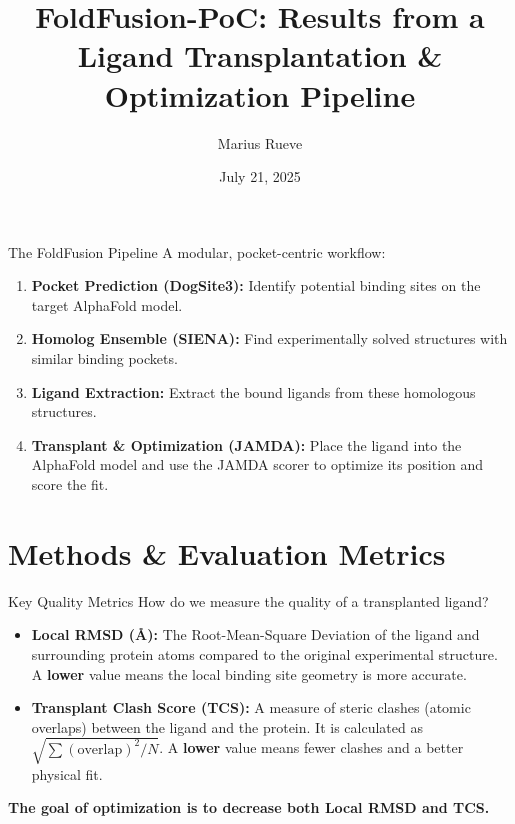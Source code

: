 \documentclass[aspectratio=169]{beamer}
\title{FoldFusion-PoC: Results from a Ligand Transplantation \& Optimization Pipeline}
\author{Marius Rueve}
\date{July 21, 2025}
\institute{University of Hamburg}
\begin{document}
\begin{frame}
    \titlepage
\end{frame}

\begin{frame}{The FoldFusion Pipeline}
    A modular, pocket-centric workflow:
    \begin{enumerate}
        \item \textbf{Pocket Prediction (DogSite3):} Identify potential binding sites on the target AlphaFold model.
        \item \textbf{Homolog Ensemble (SIENA):} Find experimentally solved structures with similar binding pockets.
        \item \textbf{Ligand Extraction:} Extract the bound ligands from these homologous structures.
        \item \textbf{Transplant \& Optimization (JAMDA):} Place the ligand into the AlphaFold model and use the JAMDA scorer to optimize its position and score the fit.
    \end{enumerate}
\end{frame}

\section{Methods \& Evaluation Metrics}

\begin{frame}{Key Quality Metrics}
    How do we measure the quality of a transplanted ligand?
    \begin{itemize}
        \item \textbf{Local RMSD (\AA):} The Root-Mean-Square Deviation of the ligand and surrounding protein atoms compared to the original experimental structure. A \textbf{lower} value means the local binding site geometry is more accurate.
              \vspace{1em}
        \item \textbf{Transplant Clash Score (TCS):} A measure of steric clashes (atomic overlaps) between the ligand and the protein. It is calculated as $\sqrt{\sum (\text{overlap})^2 / N}$. A \textbf{lower} value means fewer clashes and a better physical fit.
    \end{itemize}
    \vfill
    \textbf{The goal of optimization is to decrease both Local RMSD and TCS.}
\end{frame}
\end{document}
